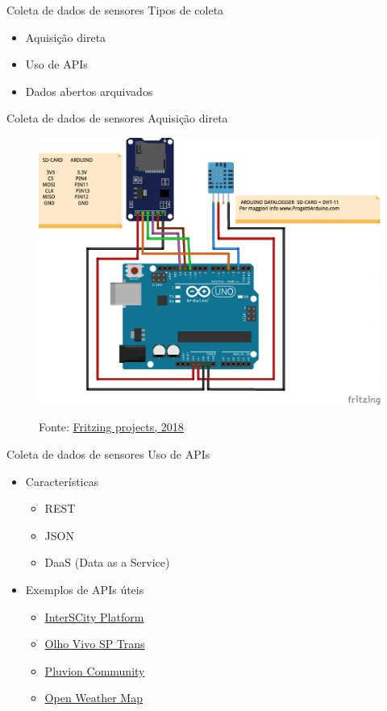 \documentclass[t]{beamer}
\begin{document}
\begin{frame}{Coleta de dados de sensores}
	Tipos de coleta
	\begin{itemize}
		\item Aquisição direta
		\item Uso de APIs
		\item Dados abertos arquivados
	\end{itemize}
\end{frame}

\begin{frame}{Coleta de dados de sensores}
	Aquisição direta
	\begin{figure}
		\includegraphics[width=0.7\linewidth]{arduinodhtdatalogger}
		
		{\scriptsize Fonte: \href{http://fritzing.org/projects/75-arduino-datalogger-temperatura-e-umidita-con-dh}{Fritzing projects, 2018}}
	\end{figure}
\end{frame}


\begin{frame}{Coleta de dados de sensores}
	Uso de APIs
	\begin{itemize}
		\item Características
		\begin{itemize}
			\item REST
			\item JSON
			\item DaaS (Data as a Service)
		\end{itemize}
		\item Exemplos de APIs úteis
		\begin{itemize}
			\item \href{http://interscity.org/software/interscity-platform/}{InterSCity Platform}
			\item \href{http://www.sptrans.com.br/desenvolvedores/APIOlhoVivo.aspx}{Olho Vivo SP Trans}
			\item \href{https://community.pluvion.com.br/}{Pluvion Community}
			\item \href{https://openweathermap.org/api}{Open Weather Map}
		\end{itemize}
	\end{itemize}
\end{frame}
\end{document}
